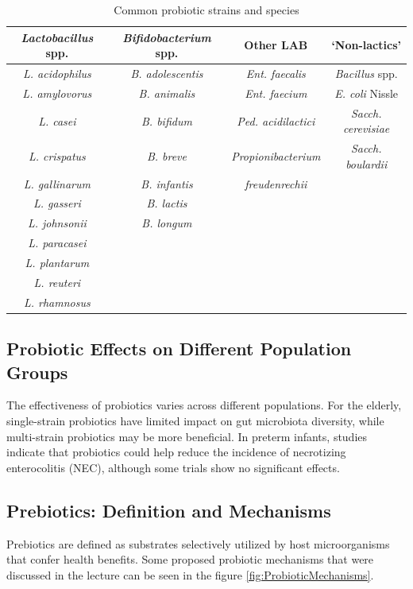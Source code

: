 \begin{table}[h]
    \centering
    \caption{Common probiotic strains and species}
    \label{tab:ProbioticStrains}
    \begin{tabular}{c|c|c|c}
        \textit{Lactobacillus} spp. & \textit{Bifidobacterium} spp. & Other LAB & ‘Non-lactics’ \\
        \hline
        \textit{L. acidophilus} & \textit{B. adolescentis} & \textit{Ent. faecalis} & \textit{Bacillus} spp. \\
        \textit{L. amylovorus} & \textit{B. animalis} & \textit{Ent. faecium} & \textit{E. coli} Nissle \\
        \textit{L. casei} & \textit{B. bifidum} & \textit{Ped. acidilactici} & \textit{Sacch. cerevisiae} \\
        \textit{L. crispatus} & \textit{B. breve} & \textit{Propionibacterium} & \textit{Sacch. boulardii} \\
        \textit{L. gallinarum} & \textit{B. infantis} & \textit{freudenrechii} &  \\
        \textit{L. gasseri} & \textit{B. lactis} &  &  \\
        \textit{L. johnsonii} & \textit{B. longum} &  &  \\
        \textit{L. paracasei} &  &  &  \\
        \textit{L. plantarum} &  &  &  \\
        \textit{L. reuteri} &  &  &  \\
        \textit{L. rhamnosus} &  &  &  \\
    \end{tabular}
\end{table}

\subsection{Probiotic Effects on Different Population Groups}
The effectiveness of probiotics varies across different populations. For the elderly, single-strain probiotics have limited impact on gut microbiota diversity, while multi-strain probiotics may be more beneficial. In preterm infants, studies indicate that probiotics could help reduce the incidence of necrotizing enterocolitis (NEC), although some trials show no significant effects.

\subsection{Prebiotics: Definition and Mechanisms}
Prebiotics are defined as substrates selectively utilized by host microorganisms that confer health benefits. Some proposed probiotic mechanisms that were discussed in the lecture can be seen in the figure \ref*{fig:ProbioticMechanisms}.

